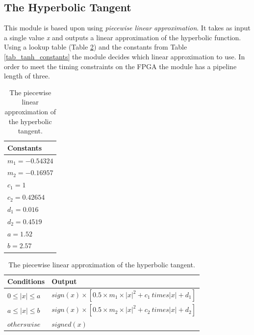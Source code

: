 
\subsection{The Hyperbolic Tangent} 

This module is based upon \cite{Lin2008} using \textit{piecewise linear approximation}. It takes  as input a single value \textit{x} and outputs a linear approximation of the hyperbolic function. Using a lookup table (Table \ref{tab_tanh}) and the constants from Table \ref{tab_tanh_constants} the module decides which linear approximation to use. 
In order to meet the timing constraints on the FPGA the module has a pipeline length of three. 

\begin{table}
	\centering
    \begin{tabular}{| >{\centering\arraybackslash}m{1.2in} |} 
    \hline
    Constants \\ \hline
    $ m_1 = -0.54324 $ \\ \hline
    $ m_2 = -0.16957 $ \\ \hline
    $ c_1 = 1 $ \\ \hline
    $ c_2 = 0.42654 $ \\ \hline
    $ d_1 = 0.016 $ \\ \hline
    $ d_2 = 0.4519 $ \\ \hline
    $ a = 1.52 $ \\ \hline
    $ b = 2.57 $ \\ \hline
        \end{tabular}
    \caption{The constant used for the hyperbolic tangent approximation.}
   	\label{tab_tanh_constants}
    
    
	\centering
    \begin{tabular}{| >{\centering\arraybackslash}m{1.2in} | >{\centering\arraybackslash}m{2.5in} |} 
    \hline
    Conditions & Output \\ \hline
    $ 0 \le |x| \le a $ & $ sign(x) \times [0.5 \times m_1 \times |x|^2 + c_1 \ times |x| + d_1] $\\ \hline
    $ a \le |x| \le b $ & $ sign(x) \times [0.5 \times m_2 \times |x|^2 + c_2 \ times |x| + d_2] $\\ \hline
   	$ otherswise $ & $ signed(x) $\\ \hline
        \end{tabular}
    \caption{The piecewise linear approximation of the hyperbolic tangent.}
   	\label{tab_tanh}
    
\end{table}

